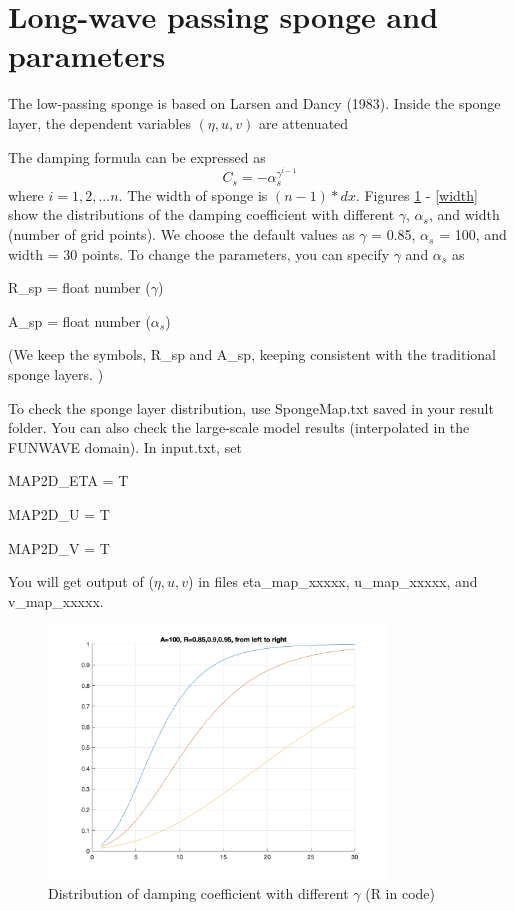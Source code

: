 \documentclass[preprint,10pt]{elsarticle}
\newcommand{\be}{\begin{equation}}
\newcommand{\ee}{\end{equation}}
\begin{document}
\section{Long-wave passing sponge and parameters}

The low-passing sponge is based on Larsen and Dancy (1983). Inside the sponge layer, the dependent variables $(\eta, u, v)$ are attenuated 

The damping formula can be expressed as
\be
C_s = -\alpha_s^{\gamma^{i-1}}
\ee
where $i = 1, 2, ... n$. The width of sponge is $(n-1)*dx$.  Figures \ref{R} - \ref{width} show the distributions of the damping coefficient with different $\gamma$,  $\alpha_s$, and width (number of grid points). We choose the default values as   $\gamma$ = 0.85, $\alpha_s$ = 100, and width = 30 points. To change the parameters, you can specify $\gamma$ and  $\alpha_s$ as

R\_sp = float number ($\gamma$)

A\_sp = float number ($\alpha_s$)

\noindent
(We keep the symbols, R\_sp and A\_sp, keeping consistent with the traditional sponge layers. )

To check the sponge layer distribution, use SpongeMap.txt saved in your result folder. You can also check the large-scale model results (interpolated in the FUNWAVE domain). In input.txt, set 

MAP2D\_ETA = T

MAP2D\_U = T

MAP2D\_V = T

You will get output of ($\eta, u, v$) in files eta\_map\_xxxxx, u\_map\_xxxxx, and v\_map\_xxxxx. 

 \begin{figure}
\begin{center}
 \includegraphics[width=0.8\textwidth]{figures/test_sponge_R.jpg}
 \caption{Distribution of damping coefficient with different $\gamma$ (R in code) }
 \label{R}
 \end{center}
 \end{figure}  
\end{document}
